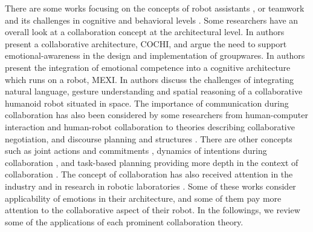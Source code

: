 There are some works focusing on the concepts of robot assistants
\cite{clancey:agent-assistants-collaboration}, or teamwork and its challenges in
cognitive and behavioral levels
\cite{nikolaidis:collaboration-joint-action,scerri:prototype-distributed-teams}.
Some researchers have an overall look at a collaboration concept at the
architectural level. In \cite{garcia:collaboration-emotional-awareness} authors
present a collaborative architecture, COCHI, and argue the need to support
emotional-awareness in the design and implementation of groupwares. In
\cite{esau:integrating-emotion-collaboration} authors present the integration of
emotional competence into a cognitive architecture which runs on a robot, MEXI.
In \cite{sofge:collaboration-humanoid-space} authors discuss the challenges of
integrating natural language, gesture understanding and spatial reasoning of a
collaborative humanoid robot situated in space. The importance of communication
during collaboration has also been considered by some researchers from
human-computer interaction and human-robot collaboration
\cite{clair:action-intention-collaboraiton,matignon:verbal-nonverbal-collaboration,rich:discourse}
to theories describing collaborative negotiation, and discourse planning and
structures
\cite{andriessen:disourse-planning,grosz:discourse-structure,sidner:discourse-collaborative-negotiation}.
There are other concepts such as joint actions and commitments
\cite{grosz:intention-dynamics-collaboration}, dynamics of intentions during
collaboration \cite{levesque:acting-together}, and task-based planning providing
more depth in the context of collaboration
\cite{burghart:cognitive-architecture-robot,rich:cea}. The concept of
collaboration has also received attention in the industry and in research in
robotic laboratories \cite{green:collaboration-literature-review}. Some of these
works consider applicability of emotions in their architecture, and some of them
pay more attention to the collaborative aspect of their robot. In the
followings, we review some of the applications of each prominent collaboration
theory.

